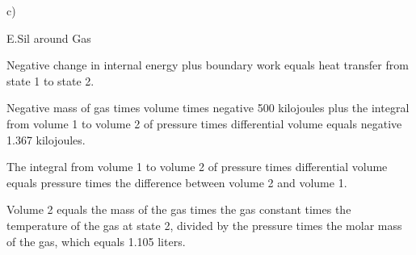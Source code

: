 c) 

E.Sil around Gas

Negative change in internal energy plus boundary work equals heat transfer from state 1 to state 2.

Negative mass of gas times volume times negative 500 kilojoules plus the integral from volume 1 to volume 2 of pressure times differential volume equals negative 1.367 kilojoules.

The integral from volume 1 to volume 2 of pressure times differential volume equals pressure times the difference between volume 2 and volume 1.

Volume 2 equals the mass of the gas times the gas constant times the temperature of the gas at state 2, divided by the pressure times the molar mass of the gas, which equals 1.105 liters.